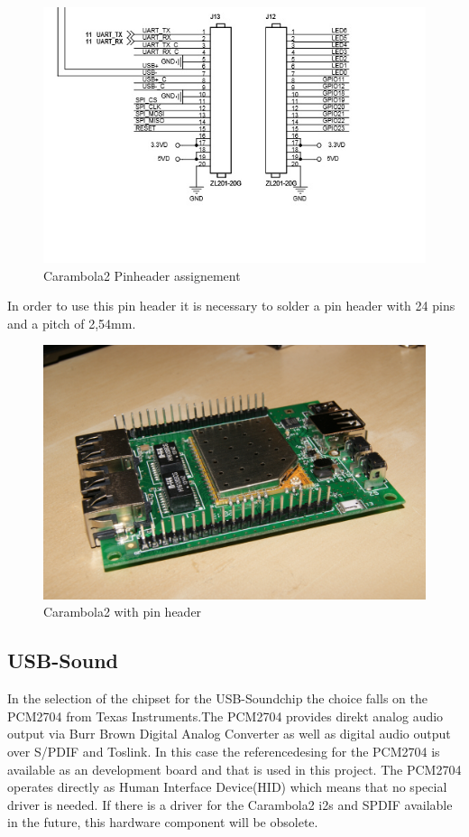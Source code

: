 \begin{figure}[h!]
	\begin{center}
	\includegraphics[scale=0.4]{pictures/carambola2_gpios}
	\caption{Carambola2 Pinheader assignement}
	\end{center}
\end{figure}

In order to use this pin header it is necessary to solder a pin header with 24 pins and a pitch of 2,54mm.

\begin{figure}[h!]
	\begin{center}
	\includegraphics[scale=0.07]{pictures/carambola2_withPinHeader}
	\caption{Carambola2 with pin header}
	\end{center}
\end{figure}


\subsection{USB-Sound}
In the selection of the chipset for the USB-Soundchip the choice falls on the PCM2704 from Texas Instruments.The PCM2704 provides direkt analog audio output via Burr Brown Digital Analog Converter as well as digital audio output over S/PDIF and Toslink. In this case the referencedesing for the PCM2704 is available as an development board and that is used in this project. The PCM2704 operates directly as Human Interface Device(HID) which means that no special driver is needed. If there is a driver for the Carambola2 i2s and SPDIF available in the future, this hardware component will be obsolete.

